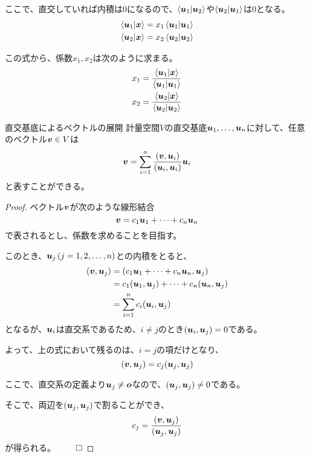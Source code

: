 \documentclass[../../../topic_linear-algebra]{subfiles}
\begin{document}
ここで、直交していれば内積は0になるので、$\braket{\vb*{u}_1|\vb*{u}_2}$や$\braket{\vb*{u}_2|\vb*{u}_1}$は0となる。
\begin{align*}
  \braket{\vb*{u}_1|\vb*{x}} & = x_1 \braket{\vb*{u}_1|\vb*{u}_1} \\
  \braket{\vb*{u}_2|\vb*{x}} & = x_2 \braket{\vb*{u}_2|\vb*{u}_2}
\end{align*}

この式から、係数$x_1, x_2$は次のように求まる。
\begin{align*}
  x_1 & = \frac{\braket{\vb*{u}_1|\vb*{x}}}{\braket{\vb*{u}_1|\vb*{u}_1}} \\
  x_2 & = \frac{\braket{\vb*{u}_2|\vb*{x}}}{\braket{\vb*{u}_2|\vb*{u}_2}}
\end{align*}

\begin{theorem}{直交基底によるベクトルの展開}\label{thm:vector-expansion-by-orthogonal-basis}
  計量空間$V$の直交基底$\vb*{u}_1, \ldots, \vb*{u}_n$に対して、任意のベクトル$\vb*{v} \in V$は
  \begin{equation*}
    \vb*{v} = \sum_{i=1}^n \frac{(\vb*{v}, \vb*{u}_i)}{(\vb*{u}_i, \vb*{u}_i)} \vb*{u}_i
  \end{equation*}
  と表すことができる。
\end{theorem}

\begin{proof}
  ベクトル$\vb*{v}$が次のような線形結合
  \begin{equation*}
    \vb*{v} = c_1 \vb*{u}_1 + \cdots + c_n \vb*{u}_n
  \end{equation*}
  で表されるとし、係数を求めることを目指す。

  このとき、$\vb*{u}_j\, (j=1,2,\ldots,n)$との内積をとると、
  \begin{align*}
    (\vb*{v}, \vb*{u}_j) & = (c_1 \vb*{u}_1 + \cdots + c_n \vb*{u}_n, \vb*{u}_j)                           \\
                         & = c_1 (\vb*{u}_1, \vb*{u}_j) + \cdots + c_n (\vb*{u}_n, \vb*{u}_j) \\
                         & = \sum_{i=1}^n c_i (\vb*{u}_i, \vb*{u}_j)
  \end{align*}
  となるが、$\vb*{u}_i$は直交系であるため、$i \neq j$のとき$(\vb*{u}_i, \vb*{u}_j) = 0$である。

  よって、上の式において残るのは、$i=j$の項だけとなり、
  \begin{equation*}
    (\vb*{v}, \vb*{u}_j) = c_j (\vb*{u}_j, \vb*{u}_j)
  \end{equation*}

  ここで、直交系の定義より$\vb*{u}_j \neq \vb*{o}$なので、$(\vb*{u}_j, \vb*{u}_j) \neq 0$である。

  そこで、両辺を$(\vb*{u}_j, \vb*{u}_j)$で割ることができ、
  \begin{equation*}
    c_j = \frac{(\vb*{v}, \vb*{u}_j)}{(\vb*{u}_j, \vb*{u}_j)}
  \end{equation*}
  が得られる。 $\qed$
\end{proof}
\end{document}
